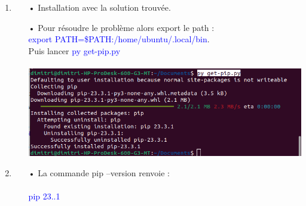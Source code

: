 \documentclass[10pt,a4paper]{article}
\begin{document}
\begin{enumerate}
\item
\begin{itemize}
\item[]
\item[•]Installation avec la solution trouvée.
\item[•] Pour résoudre le problème alors export le path :\\ \textcolor{blue}{export PATH=\$PATH:/home/ubuntu/.local/bin}.\\Puis lancer 
\textcolor{blue}{py get-pip.py}\\\\
\includegraphics[scale=0.4]{3.png}
\end{itemize}

\item
\begin{itemize}
\item[•] La commande pip --version renvoie : \\\\
\textcolor{blue}{pip 23..1}
\end{itemize}

\end{enumerate}
\end{document}
